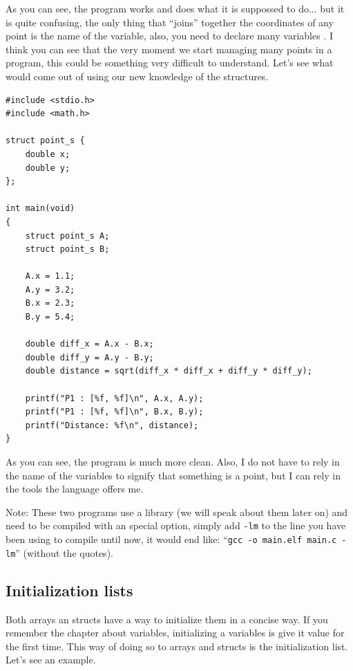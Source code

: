 \documentclass[a4paper]{article}
\begin{document}
As you can see, the program works and does what it is suppossed to do... but
it is quite confusing, the only thing that ``joins'' together the coordinates
of any point is the name of the variable, also, you need to declare many
variables . I think you can see that the very moment we start managing many
points in a program, this could be something very difficult to understand.
Let's see what would come out of using our new knowledge of the structures.

\noindent
\begin{minipage}[H]{\linewidth}
\mbox{}
\begin{lstlisting}[style=C,
caption={Calculating the distance between two points using structures},
label={lst:pointStruct}]
#include <stdio.h>
#include <math.h>

struct point_s {
    double x;
    double y;
};

int main(void)
{
    struct point_s A;
    struct point_s B;

    A.x = 1.1;
    A.y = 3.2;
    B.x = 2.3;
    B.y = 5.4;

    double diff_x = A.x - B.x;
    double diff_y = A.y - B.y;
    double distance = sqrt(diff_x * diff_x + diff_y * diff_y);

    printf("P1 : [%f, %f]\n", A.x, A.y);
    printf("P1 : [%f, %f]\n", B.x, B.y);
    printf("Distance: %f\n", distance);
}
\end{lstlisting}
\end{minipage}

As you can see, the program is much more clean. Also, I do not have to rely in
the name of the variables to signify that something is a point, but I can
rely in the tools the language offers me.

Note: These two programs use a library (we will speak about them later on)
and need to be compiled with an special option, simply add \texttt{-lm} to the
line you have been using to compile until now, it would end like:
``\texttt{gcc -o main.elf main.c -lm}'' (without the quotes).

\subsection{Initialization lists}
Both arrays an structs have a way to initialize them in a concise way. If you
remember the chapter about variables, initializing a variables is give it
value for the first time. This way of doing so to arrays and structs is the
initialization list. Let's see an example.
\end{document}
